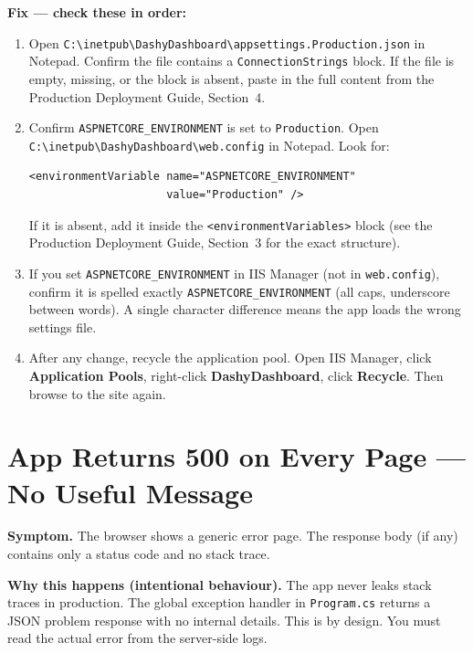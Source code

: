 \documentclass[a4paper,11pt]{article}
\begin{document}
\textbf{Fix --- check these in order:}

\begin{enumerate}
  \item Open \texttt{C:\textbackslash inetpub\textbackslash DashyDashboard\textbackslash appsettings.Production.json}
        in Notepad.
        Confirm the file contains a \texttt{ConnectionStrings} block.
        If the file is empty, missing, or the block is absent,
        paste in the full content from the Production Deployment Guide, Section~4.
  \item Confirm \texttt{ASPNETCORE\_ENVIRONMENT} is set to \texttt{Production}.
        Open \texttt{C:\textbackslash inetpub\textbackslash DashyDashboard\textbackslash web.config} in Notepad.
        Look for:
\begin{lstlisting}[language={}]
<environmentVariable name="ASPNETCORE_ENVIRONMENT"
                     value="Production" />
\end{lstlisting}
        If it is absent, add it inside the \texttt{<environmentVariables>} block
        (see the Production Deployment Guide, Section~3 for the exact structure).
  \item If you set \texttt{ASPNETCORE\_ENVIRONMENT} in IIS Manager
        (not in \texttt{web.config}), confirm it is spelled exactly
        \texttt{ASPNETCORE\_ENVIRONMENT} (all caps, underscore between words).
        A single character difference means the app loads the wrong settings file.
  \item After any change, recycle the application pool.
        Open IIS Manager, click \textbf{Application Pools},
        right-click \textbf{DashyDashboard}, click \textbf{Recycle}.
        Then browse to the site again.
\end{enumerate}

\section{App Returns 500 on Every Page --- No Useful Message}
\label{sec:generic500}

\textbf{Symptom.}
The browser shows a generic error page.
The response body (if any) contains only a status code and no stack trace.

\textbf{Why this happens (intentional behaviour).}
The app never leaks stack traces in production.
The global exception handler in \texttt{Program.cs} returns a JSON problem response with
no internal details.
This is by design.
You must read the actual error from the server-side logs.
\end{document}
